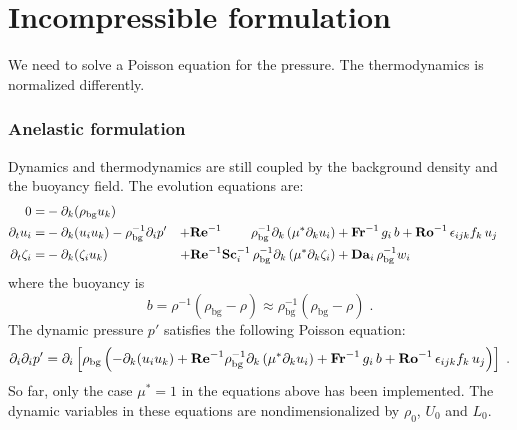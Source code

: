 \section{Incompressible formulation}

We need to solve a Poisson equation for the pressure. The thermodynamics is normalized differently.

\subsubsection{Anelastic formulation}

Dynamics and thermodynamics are still coupled by the background density and the buoyancy field. The evolution equations are:
\begin{subequations}
    \begin{align}
        0                 =& -\partial_k(\rho_\mathrm{bg}u_k)   & \\
        \partial_t  u_i   =& -\partial_k ( u_i u_k )-\rho_\mathrm{bg}^{-1}\partial_i p' &
        +\mathrm{\bf Re}^{-1}\qquad\;\rho_\mathrm{bg}^{-1}\partial_k \left( \mu^{*} \partial_k u_i\right) & +\mathrm{\bf Fr}^{-1}\, g_i\,b+\mathrm{\bf Ro}^{-1}\,\epsilon_{ijk} f_k\,u_j  \\
        \partial_t\zeta_i =& -\partial_k (\zeta_i u_k) &
        + \mathrm{\bf Re}^{-1}\mathrm{\bf Sc}_i^{-1}\, \rho_\mathrm{bg}^{-1}\partial_k \left( \mu^{*}\partial_k\zeta_i\right) &+ \mathrm{\bf Da}_i\,\rho_\mathrm{bg}^{-1}w_i
    \end{align}
\end{subequations}
where the buoyancy is
\begin{equation}
    b=\rho^{-1}(\rho_\mathrm{bg}-\rho)\approx\rho_\mathrm{bg}^{-1}(\rho_\mathrm{bg}-\rho) \;.
\end{equation}
The dynamic pressure $p'$ satisfies the following Poisson equation:
\begin{equation}
    \partial_i\partial_ip'=\partial_i\left[\rho_\mathrm{bg}\left(
    -\partial_k ( u_i u_k )+\mathrm{\bf Re}^{-1}\rho_\mathrm{bg}^{-1}\partial_k \left( \mu^{*} \partial_k u_i\right) +\mathrm{\bf Fr}^{-1}\, g_i\,b+\mathrm{\bf Ro}^{-1}\,\epsilon_{ijk} f_k\,u_j
    \right)\right]\;.
\end{equation}
So far, only the case $\mu^*=1$ in the equations above has been implemented. The dynamic variables in these equations are  nondimensionalized by $\rho_0$, $U_0$ and $L_0$.

